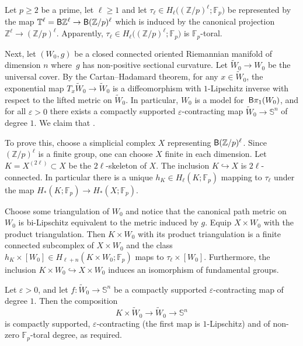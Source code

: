 \documentclass[10pt,a4paper]{amsart}
\numberwithin{equation}{section}
\newcommand{\F}{\mathbb{F}}
\newcommand{\Z}{\mathbb{Z}}
\newcommand{\SSS}{\mathbb{S}}
\newcommand{\TTT}{\mathbb{T}}
\newcommand{\eps}{\varepsilon}
\newcommand{\sB}{{\sf B}}
\begin{document}
\begin{Example} \label{ex:torsion} Let $p \geq 2$ be a prime, let $\ell \geq 1$ and let $\tau_\ell \in H_\ell \big( (\Z/p)^\ell ; \F_p\big)$ be represented by the map
$
 \TTT^\ell = \sB \Z^{\ell} \to \sB (\Z/p)^{\ell}$
which is induced by the canonical projection $\Z^{\ell} \to (\Z/p)^{\ell}$.
Apparently, $\tau_\ell \in H_\ell\big( (\Z/p)^{\ell} ; \F_p\big)$ is $\F_p$-toral.

Next, let $(W_0, g)$ be a closed connected oriented Riemannian manifold of dimension $n$ where~$g$ has non-positive sectional curvature.
Let $\tilde W_0 \to W_0$ be the universal cover.
By the Cartan--Hadamard theorem, for any $x \in \tilde W_0$, the exponential map $T_x \tilde W_0 \to \tilde W_0$ is a diffeomorphism with $1$-Lipschitz inverse with respect to the lifted metric on $\tilde W_0$.
In particular, $W_0$ is a model for~$\sB \pi_1(W_0)$, and for all $\eps>0$ there exists a compactly supported $\eps$-contracting map $\tilde W_0 \to \SSS^n$ of degree $1$.
We claim that \smash{$\tau_\ell \times [W_0] \in H_{\ell + n}^{\text{\rm tor-}\ell/{\F_p}\text{\rm -enl}}\big((\Z/p)^{\ell} \times \pi_1(W_0) ; \F_p\big)$}.

To prove this, choose a simplicial complex $X$ representing $\sB (\Z/p)^{\ell}$.
Since $(\Z/p)^{\ell}$ is a finite group, one can choose $X$ finite in each dimension.
Let $K = X^{(2\ell)} \subset X$ be the $2\ell$-skeleton of $X$.
The inclusion $K \hookrightarrow X$ is $2 \ell $-connected.
In particular there is a unique $h_K \in H_\ell( K ; \F_p)$ mapping to $\tau_\ell$ under the map $H_*(K ; \F_p) \to H_*(X ; \F_p)$.


Choose some triangulation of $W_0$ and notice that the canonical path metric on $W_0$ is bi-Lipschitz equivalent to the metric induced by $g$.
Equip $X \times W_0$ with the product triangulation.
Then $K \times W_0$ with its product triangulation is a finite connected subcomplex of $X \times W_0$ and the class $h_K \times [W_0] \in H_{\ell + n}(K \times W_0 ; \F_p)$ maps to $\tau_\ell \times [W_0]$.
Furthermore, the inclusion $K \times W_0 \hookrightarrow X \times W_0$ induces an isomorphism of fundamental groups.


Let $\eps> 0 $, and let $f \colon \tilde W_0 \to \SSS^{n}$ be a compactly supported $\eps$-contracting map of degree $1$.
Then the composition
\[
 K \times \tilde W_0 \to \tilde W_0 \to \SSS^{n}
\]
is compactly supported, $\eps$-contracting (the first map is $1$-Lipschitz) and of non-zero $\F_p$-toral degree, as required.


\end{Example}
\end{document}
